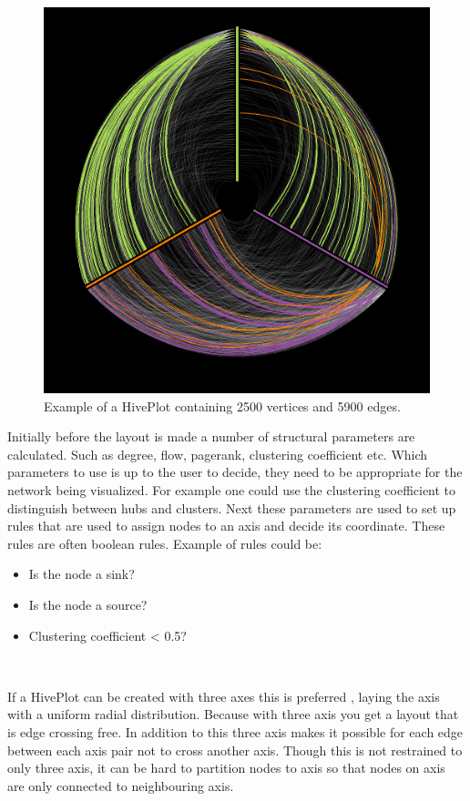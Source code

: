 \documentclass[a4paper,11pt]{kth-mag}
\begin{document}
\begin{figure}[!htbp]
	\centering
	\includegraphics[scale=0.5]{hiveplotEx1}
	\caption{Example of a HivePlot containing 2500 vertices and 5900 edges.}
	\label{fig:hive_plot}
\end{figure}

Initially before the layout is made a number of structural parameters are calculated. Such as degree, flow, pagerank, clustering coefficient etc. Which parameters to use is up to the user to decide, they need to be appropriate for the network
being visualized. For example one could use the clustering coefficient to distinguish between hubs and clusters. Next these parameters are used to set up rules that are used to assign nodes to an axis and decide its coordinate. These rules
are often boolean rules. Example of rules could be: \
\begin{itemize}
	\item{Is the node a sink?}
	\item{Is the node a source?}
	\item{Clustering coefficient < 0.5?}
\end{itemize}
\

If a HivePlot can be created with three axes this is preferred \cite{Krzywinski01092012}, laying the axis with a uniform radial distribution. Because with three axis you get a layout that is edge crossing free. In addition to this 
three axis makes it possible for each edge between each axis pair not to cross another axis. Though this is not restrained to only three axis, it can be hard to partition nodes to axis so that nodes on axis are only connected
to neighbouring axis.
\end{document}
